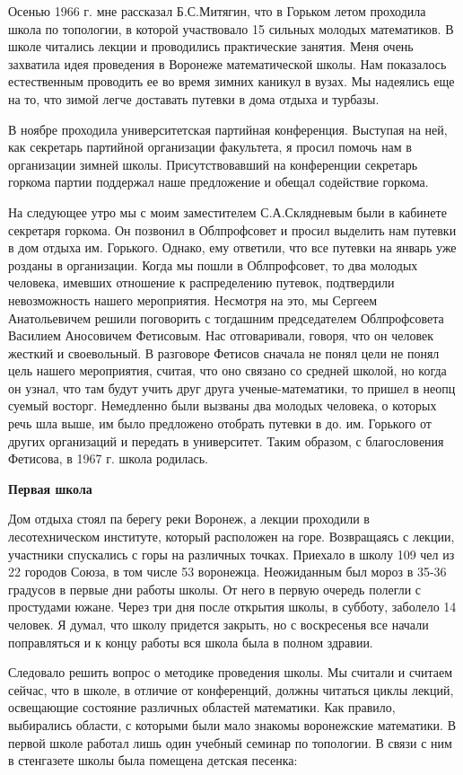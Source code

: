 Осенью 1966 г. мне рассказал Б.С.Митягин, что в Горьком летом проходила школа по топологии, в которой участвовало 15 сильных молодых математиков. В школе читались лекции и проводились практические занятия. Меня очень захватила идея проведения в Воронеже математической школы.
Нам показалось естественным проводить ее во время зимних каникул в вузах. Мы надеялись еще на то, что зимой легче доставать путевки в дома отдыха и турбазы.

В ноябре проходила университетская партийная конференция. Выступая на ней, как секретарь партийной организации факультета, я просил помочь нам в организации зимней школы. Присутствовавший на конференции секретарь горкома партии поддержал наше предложение и обещал содействие горкома.

На следующее утро мы с моим заместителем С.А.Склядневым были в кабинете секретаря горкома. Он позвонил в Облпрофсовет и просил выделить нам путевки в дом отдыха им. Горького. Однако, ему ответили, что все путевки на январь уже розданы в организации. Когда мы пошли в Облпрофсовет, то два молодых человека, имевших отношение к распределению путевок, подтвердили невозможность нашего мероприятия. Несмотря на это, мы Сергеем Анатольевичем решили поговорить с тогдашним председателем Облпрофсовета Василием Аносовичем Фетисовым. Нас отговаривали, говоря, что он человек жесткий и своевольный. В разговоре Фетисов сначала не понял цели не понял цель нашего мероприятия, считая, что оно связано со средней школой, но когда он
узнал, что там будут учить друг друга ученые-математики, то пришел в неопц суемый восторг. Немедленно были вызваны два молодых человека, о которых речь шла выше, им было предложено отобрать путевки в до. им. Горького от других организаций и передать в университет. Таким образом, с благословения Фетисова, в 1967 г. школа родилась.

{\bf Первая школа}

Дом отдыха стоял па берегу реки Воронеж, а лекции проходили в лесотехническом институте, который расположен на горе. Возвращаясь с лекции, участники спускались с горы на различных точках. Приехало в школу 109 чел из 22 городов Союза, в том числе 53 воронежца. Неожиданным был мороз в 35-36 градусов в первые дни работы школы. От него в первую очередь полегли с простудами южане. Через три дня после открытия школы, в субботу, заболело 14 человек. Я думал, что школу придется закрыть, но с воскресенья все начали поправляться и к концу работы вся школа была в полном здравии.

Следовало решить вопрос о методике проведения школы. Мы считали и считаем сейчас, что в школе, в отличие от конференций, должны читаться циклы лекций, освещающие состояние различных областей математики. Как правило, выбирались области, с которыми были мало знакомы воронежские математики.
В первой школе работал лишь один учебный семинар по топологии. В связи с ним в стенгазете школы была помещена детская песенка:

